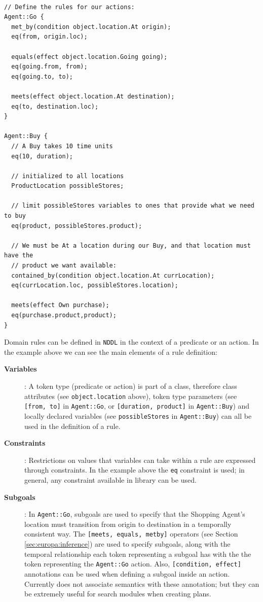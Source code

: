 \begin{verbatim}

// Define the rules for our actions:
Agent::Go {
  met_by(condition object.location.At origin);
  eq(from, origin.loc);
 
  equals(effect object.location.Going going);
  eq(going.from, from);
  eq(going.to, to);
   
  meets(effect object.location.At destination);
  eq(to, destination.loc);
}

Agent::Buy {
  // A Buy takes 10 time units
  eq(10, duration);

  // initialized to all locations
  ProductLocation possibleStores;

  // limit possibleStores variables to ones that provide what we need to buy
  eq(product, possibleStores.product);

  // We must be At a location during our Buy, and that location must have the
  // product we want available:
  contained_by(condition object.location.At currLocation);
  eq(currLocation.loc, possibleStores.location);
  
  meets(effect Own purchase);
  eq(purchase.product,product);
}
\end{verbatim}

Domain rules can be defined in \texttt{NDDL} in the context of a
predicate or an action. In the example above we can see the main
elements of a rule definition:

\begin{description}

\item[\textbf{Variables}]: A token type (predicate or action) is part
  of a class, therefore class attributes (see \texttt{object.location}
  above), token type parameters (see \texttt{[from, to]} in
  \texttt{Agent::Go}, or \texttt{[duration, product]} in
  \texttt{Agent::Buy}) and locally declared variables (see
  \texttt{possibleStores} in \texttt{Agent::Buy}) can all be used in
  the definition of a rule.

\item[\textbf{Constraints}]: Restrictions on values that variables can
  take within a rule are expressed through constraints. In the example
  above the \texttt{eq} constraint is used; in general, any constraint
  available in \eus library can be used.

\item[\textbf{Subgoals}]: In \texttt{Agent::Go}, subgoals are used to
  specify that the Shopping Agent's location must transition from
  origin to destination in a temporally consistent way. The
  \texttt{[meets, equals, metby]} operators (see Section
  \ref{sec:europa:inference}) are used to specify subgoals, along with
  the temporal relationship each token representing a subgoal has with
  the the token representing the \texttt{Agent::Go} action. Also,
  \texttt{[condition, effect]} annotations can be used when defining a
  subgoal inside an action. Currently \eu does not associate semantics
  with these annotation; but they can be extremely useful for search
  modules when creating plans.

\end{description}

